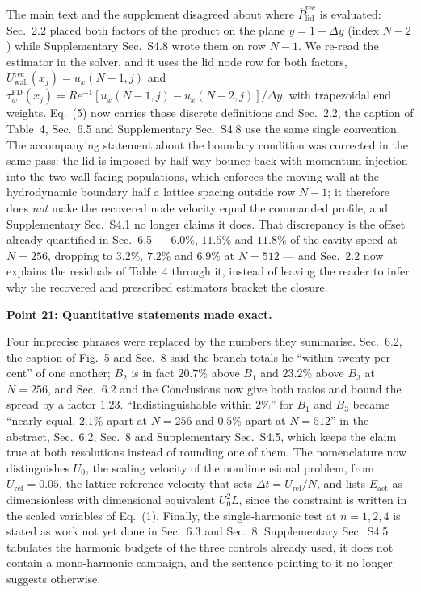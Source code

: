 \documentclass[11pt,a4paper]{article}
\begin{document}
The main text and the supplement disagreed about where
$\overline{P}_{\mathrm{lid}}^{\mathrm{rec}}$ is evaluated: Sec.~2.2 placed both
factors of the product on the plane $y=1-\Delta y$ (index $N-2$) while
Supplementary Sec.~S4.8 wrote them on row $N-1$. We re-read the estimator in the
solver, and it uses the lid node row for both factors,
$U_{\mathrm{wall}}^{\mathrm{rec}}(x_j)=u_x(N-1,j)$ and
$\tau_w^{\mathrm{FD}}(x_j)=Re^{-1}[u_x(N-1,j)-u_x(N-2,j)]/\Delta y$, with
trapezoidal end weights. Eq.~(5) now carries those discrete definitions and
Sec.~2.2, the caption of Table~4, Sec.~6.5 and Supplementary Sec.~S4.8 use the
same single convention. The accompanying statement about the boundary condition
was corrected in the same pass: the lid is imposed by half-way bounce-back with
momentum injection into the two wall-facing populations, which enforces the moving
wall at the hydrodynamic boundary half a lattice spacing outside row $N-1$; it
therefore does \emph{not} make the recovered node velocity equal the commanded
profile, and Supplementary Sec.~S4.1 no longer claims it does. That discrepancy is
the offset already quantified in Sec.~6.5 --- $6.0\%$, $11.5\%$ and $11.8\%$ of the
cavity speed at $N=256$, dropping to $3.2\%$, $7.2\%$ and $6.9\%$ at $N=512$ ---
and Sec.~2.2 now explains the residuals of Table~4 through it, instead of leaving
the reader to infer why the recovered and prescribed estimators bracket the
closure.

\vspace{1em}

\noindent\textbf{Point 21: Quantitative statements made exact.}

Four imprecise phrases were replaced by the numbers they summarise. Sec.~6.2, the
caption of Fig.~5 and Sec.~8 said the branch totals lie ``within twenty per cent''
of one another; $B_2$ is in fact $20.7\%$ above $B_1$ and $23.2\%$ above $B_3$ at
$N=256$, and Sec.~6.2 and the Conclusions now give both ratios and bound the
spread by a factor $1.23$. ``Indistinguishable within $2\%$'' for $B_1$ and $B_3$
became ``nearly equal, $2.1\%$ apart at $N=256$ and $0.5\%$ apart at $N=512$'' in
the abstract, Sec.~6.2, Sec.~8 and Supplementary Sec.~S4.5, which keeps the claim
true at both resolutions instead of rounding one of them. The nomenclature now
distinguishes $U_0$, the scaling velocity of the nondimensional problem, from
$U_{\mathrm{ref}}=0.05$, the lattice reference velocity that sets
$\Delta t=U_{\mathrm{ref}}/N$, and lists $E_{\mathrm{act}}$ as dimensionless with
dimensional equivalent $U_0^2L$, since the constraint is written in the scaled
variables of Eq.~(1). Finally, the single-harmonic test at $n=1,2,4$ is stated as
work not yet done in Sec.~6.3 and Sec.~8: Supplementary Sec.~S4.5 tabulates the
harmonic budgets of the three controls already used, it does not contain a
mono-harmonic campaign, and the sentence pointing to it no longer suggests
otherwise.
\end{document}
